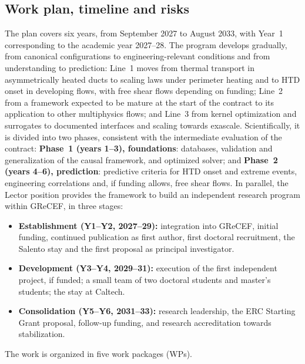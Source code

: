 \documentclass[11pt]{article}
\begin{document}
\subsection{Work plan, timeline and risks}\label{sec:workplan}
The plan covers six years, from September 2027 to August 2033, with Year~1 corresponding to
the academic year 2027--28. The program develops gradually, from canonical configurations to
engineering-relevant conditions and from understanding to prediction: Line~1 moves from thermal
transport in asymmetrically heated ducts to scaling laws under perimeter heating and to HTD onset
in developing flows, with free shear flows depending on funding; Line~2 from a framework expected
to be mature at the start of the contract to its application to other multiphysics flows; and
Line~3 from kernel optimization and surrogates to documented interfaces and scaling towards
exascale. Scientifically, it is divided into two phases, consistent with the
intermediate evaluation of the contract: \textbf{Phase~1 (years 1--3), foundations}:
databases, validation and generalization of the causal framework, and optimized solver; and
\textbf{Phase~2 (years 4--6), prediction}: predictive criteria for HTD onset and extreme events,
engineering correlations and, if funding allows, free shear flows. In parallel, the Lector position
provides the framework to build an independent research program within GReCEF, in three
stages:
\begin{itemize}
  \item \textbf{Establishment (Y1--Y2, 2027--29):} integration into GReCEF, initial funding,
  continued publication as first author, first doctoral recruitment, the Salento stay and the first proposal as principal
  investigator.
  \item \textbf{Development (Y3--Y4, 2029--31):} execution of the first independent project,
  if funded; a small team of two doctoral students and master's students; the stay at
  Caltech.
  \item \textbf{Consolidation (Y5--Y6, 2031--33):} research leadership, the ERC Starting Grant
  proposal, follow-up funding, and research accreditation towards stabilization.
\end{itemize}
The work is organized in five work packages (WPs).
\end{document}
